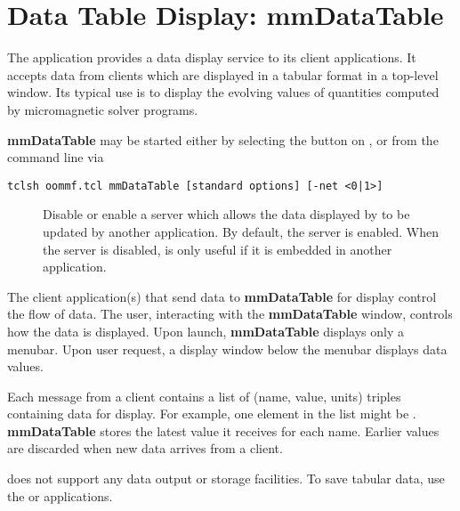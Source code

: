 \section{Data Table Display: mmDataTable}\label{sec:mmdatatable}%

\begin{center}
\end{center}

The application  provides a data display service to its
client applications.  It accepts data from clients which are displayed in
a tabular format in a top-level window.  Its typical use is to display
the evolving values of quantities computed by micromagnetic solver
programs.

{\bf mmDataTable} may be started either by selecting the
 button on , 
or from the command line via
\begin{verbatim}
tclsh oommf.tcl mmDataTable [standard options] [-net <0|1>]
\end{verbatim}

\begin{description}
\item[]
  Disable or enable a server which allows the data displayed by
   to be updated by another application.
  By default, the server is enabled.  When the server is disabled,
   is only useful if it is embedded in another application.
\end{description}

The client application(s) that send data to {\bf mmDataTable} for 
display control the flow of data.  The user, interacting with
the {\bf mmDataTable} window, controls how the data is displayed.
Upon launch, {\bf mmDataTable} displays only a menubar.  Upon user
request, a display window below the menubar displays data values.

Each message from a client contains a list of
(name, value, units) triples containing data for display.  
For example, one element in the list might be 
.  {\bf mmDataTable}
stores the latest value it receives for each name.  Earlier
values are discarded when new data arrives from a client.

 does not support any data output or storage
facilities.  To save tabular data, use the
or
 applications.

